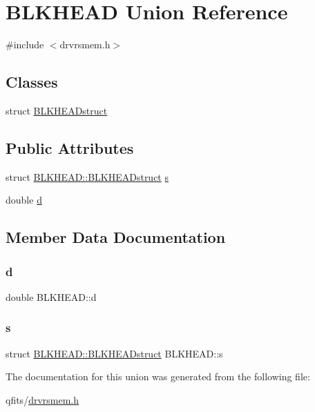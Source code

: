 \hypertarget{union_b_l_k_h_e_a_d}{}\section{B\+L\+K\+H\+E\+AD Union Reference}
\label{union_b_l_k_h_e_a_d}


{\ttfamily \#include $<$drvrsmem.\+h$>$}

\subsection*{Classes}
\begin{DoxyCompactItemize}
\item 
struct \hyperlink{struct_b_l_k_h_e_a_d_1_1_b_l_k_h_e_a_dstruct}{B\+L\+K\+H\+E\+A\+Dstruct}
\end{DoxyCompactItemize}
\subsection*{Public Attributes}
\begin{DoxyCompactItemize}
\item 
struct \hyperlink{struct_b_l_k_h_e_a_d_1_1_b_l_k_h_e_a_dstruct}{B\+L\+K\+H\+E\+A\+D\+::\+B\+L\+K\+H\+E\+A\+Dstruct} \hyperlink{union_b_l_k_h_e_a_d_afc4066c23d5fc86c82115ba2ee9a8aa0}{s}
\item 
double \hyperlink{union_b_l_k_h_e_a_d_a90d446fcb7589c410b299775d247ec88}{d}
\end{DoxyCompactItemize}


\subsection{Member Data Documentation}
\mbox{\label{union_b_l_k_h_e_a_d_a90d446fcb7589c410b299775d247ec88}} 
\subsubsection{\texorpdfstring{d}{d}}
{\footnotesize\ttfamily double B\+L\+K\+H\+E\+A\+D\+::d}

\mbox{\label{union_b_l_k_h_e_a_d_afc4066c23d5fc86c82115ba2ee9a8aa0}} 
\subsubsection{\texorpdfstring{s}{s}}
{\footnotesize\ttfamily struct \hyperlink{struct_b_l_k_h_e_a_d_1_1_b_l_k_h_e_a_dstruct}{B\+L\+K\+H\+E\+A\+D\+::\+B\+L\+K\+H\+E\+A\+Dstruct}  B\+L\+K\+H\+E\+A\+D\+::s}



The documentation for this union was generated from the following file\+:\begin{DoxyCompactItemize}
\item 
qfits/\hyperlink{drvrsmem_8h}{drvrsmem.\+h}\end{DoxyCompactItemize}
